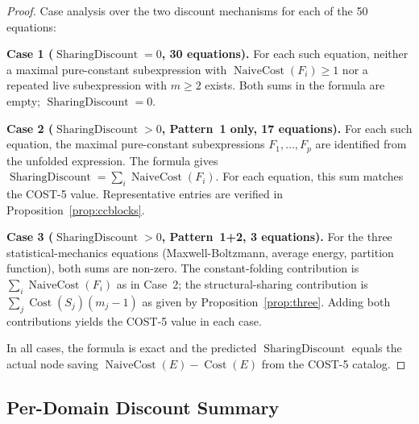 \documentclass[12pt,a4paper]{article}
\theoremstyle{definition}
\newcommand{\Cost}{\operatorname{Cost}}
\newcommand{\NC}{\operatorname{NaiveCost}}
\newcommand{\SD}{\operatorname{SharingDiscount}}
\begin{document}
\begin{proof}
Case analysis over the two discount mechanisms for each of the 50 equations:

\textbf{Case 1 ($\SD = 0$, 30 equations).}
For each such equation, neither a maximal pure-constant subexpression with
$\NC(F_i) \geq 1$ nor a repeated live subexpression with $m \geq 2$ exists.
Both sums in the formula are empty; $\SD = 0$.

\textbf{Case 2 ($\SD > 0$, Pattern~1 only, 17 equations).}
For each such equation, the maximal pure-constant subexpressions $F_1, \ldots, F_p$
are identified from the unfolded expression.  The formula gives
$\SD = \sum_i \NC(F_i)$.  For each equation, this sum matches the COST-5
value.  Representative entries are verified in
Proposition~\ref{prop:ccblocks}.

\textbf{Case 3 ($\SD > 0$, Pattern~1+2, 3 equations).}
For the three statistical-mechanics equations (Maxwell-Boltzmann, average
energy, partition function), both sums are non-zero.  The constant-folding
contribution is $\sum_i \NC(F_i)$ as in Case~2; the structural-sharing
contribution is $\sum_j \Cost(S_j)(m_j - 1)$ as given by
Proposition~\ref{prop:three}.  Adding both contributions yields the
COST-5 value in each case.

In all cases, the formula is exact and the predicted $\SD$ equals the
actual node saving $\NC(E) - \Cost(E)$ from the COST-5 catalog.
\end{proof}

\subsection{Per-Domain Discount Summary}
\end{document}
